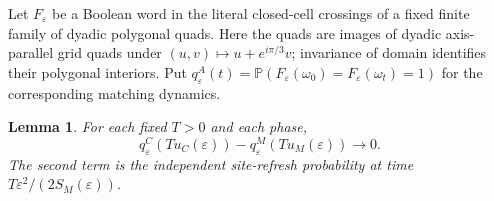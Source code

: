 \documentclass[11pt]{article}
\newtheorem{lemma}[theorem]{Lemma}
\newcommand{\Pp}{\mathbb P}
\begin{document}
Let $F_\varepsilon$ be a Boolean word in the literal closed-cell crossings
of a fixed finite family of dyadic polygonal quads. Here the quads are
images of dyadic axis-parallel grid quads under
$(u,v)\mapsto u+e^{i\pi/3}v$; invariance of domain
\cite[Theorem 2B.3]{Hatcher} identifies their polygonal interiors. Put
$q^A_\varepsilon(t)=\Pp(F_\varepsilon(\omega_0)=
F_\varepsilon(\omega_t)=1)$ for the corresponding matching dynamics.

\begin{lemma}\label{lem:word}
For each fixed $T>0$ and each phase,
\begin{equation}\label{eq:word}
 q^C_\varepsilon(Tu_C(\varepsilon))-
 q^M_\varepsilon(Tu_M(\varepsilon))\longrightarrow0.
\end{equation}
The second term is the independent site-refresh probability at time
$T\varepsilon^2/(2S_M(\varepsilon))$.
\end{lemma}
\end{document}
